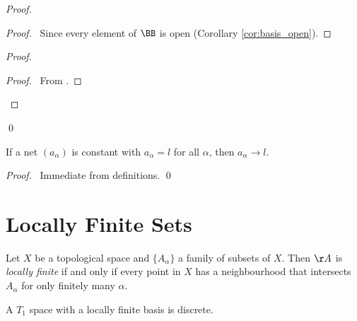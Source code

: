 \begin{proof}
    \pf
    \begin{proof}
        \pf\ Since every element of $\BB$ is open (Corollary \ref{cor:basis_open}).
    \end{proof}
    \begin{proof}
        \begin{proof}
            \pf\ From .
        \end{proof}
    \end{proof}
    \qed
\end{proof}

\begin{lemma}
    \label{lemma:converge_constant}
    If a net $(a_\alpha)$ is constant with $a_\alpha = l$ for all $\alpha$, then $a_\alpha \rightarrow l$.
\end{lemma}

\begin{proof}
    \pf\ Immediate from definitions. \qed
\end{proof}

\section{Locally Finite Sets}

\begin{definition}
    Let $X$ be a topological space and $\{ A_\alpha \}$ a family of subsets of $X$. Then $\AA$ is \emph{locally finite} if and only if every point in $X$ has a neighbourhood that
    intersects $A_\alpha$ for only finitely many $\alpha$.
\end{definition}

\begin{proposition}
    A $T_1$ space with a locally finite basis is discrete.
\end{proposition}

